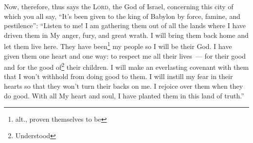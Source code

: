 
\begin{inparaenum}
     Now, therefore, thus says the \textsc{Lord}, the God of Israel, concerning this city of which you all say, ``It's been given to the king of Babylon by force, famine, and pestilence'':%
     ``Listen to me! I am gathering them out of all the lands where I have driven them in My anger, fury, and great wrath. I will bring them back home and let them live here.%
     They have been\footnote{alt., proven themselves to be} my people so I will be their God.%
     I have given them one heart and one way: to respect me all their lives~--- for their good and for the good of\footnote{Understood} their children.%
     I will make an everlasting covenant with them that I won't withhold from doing good to them. I will instill my fear in their hearts so that they won't turn their backs on me.%
     I rejoice over them when they do good. With all My heart and soul, I have planted them in this land of truth.''%
\end{inparaenum}
